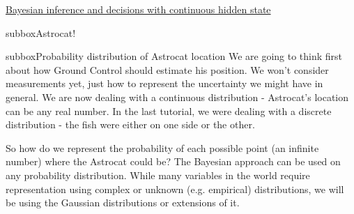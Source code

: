 \begin{textbox}{\href{https://compneuro.neuromatch.io/tutorials/W3D1_BayesianDecisions/student/W3D1_Tutorial2.html}{Bayesian inference and decisions with continuous hidden state } }
\begin{subbox}{subbox}{Astrocat!}
\end{subbox}

\begin{subbox}{subbox}{Probability distribution of Astrocat location}
\scriptsize
We are going to think first about how Ground Control should estimate his position. We won't consider measurements yet, just how to represent the uncertainty we might have in general. We are now dealing with a continuous distribution - Astrocat's location can be any real number. In the last tutorial, we were dealing with a discrete distribution - the fish were either on one side or the other. 

So how do we represent the probability of each possible point (an infinite number) where the Astrocat could be? 
The Bayesian approach can be used on any probability distribution. While many variables in the world require representation using complex or unknown (e.g. empirical) distributions, we will be using the Gaussian distributions or extensions of it.

\end{subbox}
\end{textbox}
